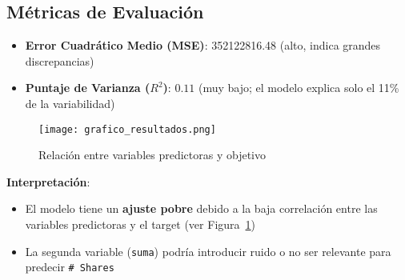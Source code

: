 \documentclass{article}
\begin{document}
\subsection{Métricas de Evaluación}
\begin{itemize}
    \item \textbf{Error Cuadrático Medio (MSE)}: \num{352122816.48} (alto, indica grandes discrepancias)
    \item \textbf{Puntaje de Varianza ($R^2$)}: $0.11$ (muy bajo; el modelo explica solo el 11\% de la variabilidad)
\end{itemize}

\begin{figure}[h]
    \centering
    \texttt{[image: grafico\_resultados.png]}
    \caption{Relación entre variables predictoras y objetivo}
    \label{fig:resultados}
\end{figure}

\textbf{Interpretación}:
\begin{itemize}
    \item El modelo tiene un \textbf{ajuste pobre} debido a la baja correlación entre las variables predictoras y el target (ver Figura~\ref{fig:resultados})
    \item La segunda variable (\texttt{suma}) podría introducir ruido o no ser relevante para predecir \texttt{\# Shares}
\end{itemize}
\end{document}
